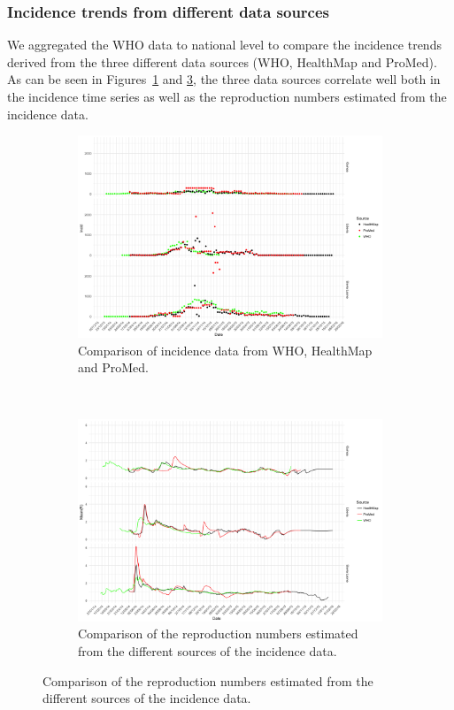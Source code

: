 \documentclass[11pt,]{article}
\begin{document}
\subsubsection{Incidence trends from different data sources}
We aggregated the WHO data to national level to compare the incidence
trends derived from the three different data sources (WHO, HealthMap
and ProMed). As can be seen in Figures~\ref{fig:incid_comp} and \ref{fig:r_comp}, the
three data sources correlate well both in the incidence time series as
well as the reproduction numbers estimated from the incidence data.
\begin{figure}
    \centering
    \begin{subfigure}[b]{0.8\textwidth}
        \includegraphics[width=\textwidth]{ms6-figures/who_vs_hm_vs_pm-incid.png}
        \caption{Comparison of incidence data from WHO, HealthMap and ProMed.}
        \label{fig:incid_comp}
      \end{subfigure}
      ~
    \begin{subfigure}[b]{0.8\textwidth}
        \includegraphics[width=\textwidth]{ms6-figures/who_vs_hm_vs_pm-R.png}
        \caption{Comparison of the reproduction numbers estimated from
        the different sources of the incidence data.}
        \label{fig:r_comp}
    \end{subfigure}
  \end{figure}
  
\end{document}
